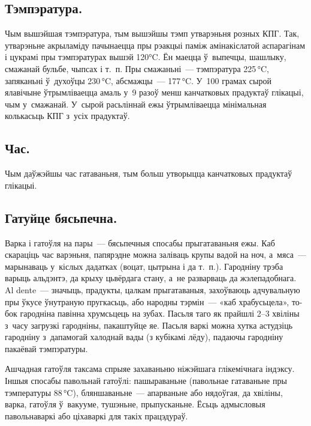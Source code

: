 \subsection{Тэмпэратура.}
Чым вышэйшая тэмпэратура, тым вышэйшы тэмп утварэньня розных КПГ. Так, утварэньне акрыламіду пачынаецца пры рэакцыі паміж амінакіслатой аспарагінам і цукрамі пры тэмпэратурах вышэй 120°C. Ён маецца ў~выпечцы, шашлыку, смажанай бульбе, чыпсах і т.~п. Пры смажаньні~--- тэмпэратура 225\,°C, запяканьні ў~духоўцы 230\,°C, абсмажцы~--- 177\,°C. У~100 грамах сырой ялавічыне ўтрымліваецца амаль у~9 разоў менш канчатковых прадуктаў глікацыі, чым у~смажанай. У~сырой расьліннай ежы ўтрымліваецца мінімальная колькасьць КПГ з~усіх прадуктаў.

\subsection{Час.}
Чым даўжэйшы час гатаваньня, тым больш утворыцца канчатковых прадуктаў глікацыі.


\subsection{Гатуйце бясьпечна.}
Варка і гатоўля на пары~--- бясьпечныя спосабы прыгатаваньня ежы. Каб скараціць час варэньня, папярэдне можна заліваць крупы вадой на ноч, а~мяса~--- марынаваць у~кіслых дадатках (воцат, цытрына і да т.~п.). Гародніну трэба варыць альдэнтэ, да крыху цьвёрдага стану, а~не разварваць да жэлепадобнага. Al dente~--- значыць, прадукты, цалкам прыгатаваныя, захоўваюць адчувальную пры ўкусе ўнутраную пругкасьць, або народны тэрмін~--- «каб храбусьцела», то-бок гародніна павінна хрумсьцець на зубах. Пасьля таго як прайшлі 2--3 хвіліны з~часу загрузкі гародніны, пакаштуйце яе. Пасьля варкі можна хутка астудзіць гародніну з~дапамогай халоднай вады (з кубікамі лёду), падаючы гародніну пакаёвай тэмпэратуры.

Ашчадная гатоўля таксама спрыяе захаваньню ніжэйшага глікемічнага індэксу. Іншыя спосабы павольнай гатоўлі: пашыраваньне (павольнае гатаваньне пры тэмпературы 88\,°C), бляншаваньне~--- апарваньне або нядоўгая, да хвіліны, варка, гатоўля ў~вакууме, тушэньне, прыпусканьне. Ёсьць адмысловыя павольнаваркі або ціхаваркі для такіх працэдураў.

